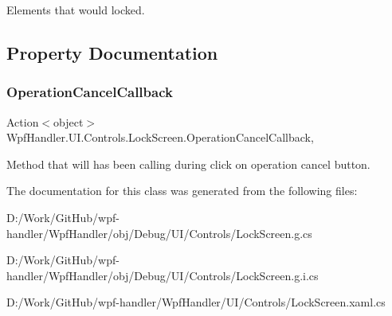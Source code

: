 Elements that would locked. 



\subsection{Property Documentation}
\mbox{\label{class_wpf_handler_1_1_u_i_1_1_controls_1_1_lock_screen_a43e0275f123b6e3d5dcf2f9032a67e82}} 
\subsubsection{\texorpdfstring{Operation\+Cancel\+Callback}{OperationCancelCallback}}
{\footnotesize\ttfamily Action$<$object$>$ Wpf\+Handler.\+U\+I.\+Controls.\+Lock\+Screen.\+Operation\+Cancel\+Callback\hspace{0.3cm}{\ttfamily [get]}, {\ttfamily [set]}}



Method that will has been calling during click on operation cancel button. 



The documentation for this class was generated from the following files\+:\begin{DoxyCompactItemize}
\item 
D\+:/\+Work/\+Git\+Hub/wpf-\/handler/\+Wpf\+Handler/obj/\+Debug/\+U\+I/\+Controls/Lock\+Screen.\+g.\+cs\item 
D\+:/\+Work/\+Git\+Hub/wpf-\/handler/\+Wpf\+Handler/obj/\+Debug/\+U\+I/\+Controls/Lock\+Screen.\+g.\+i.\+cs\item 
D\+:/\+Work/\+Git\+Hub/wpf-\/handler/\+Wpf\+Handler/\+U\+I/\+Controls/Lock\+Screen.\+xaml.\+cs\end{DoxyCompactItemize}

